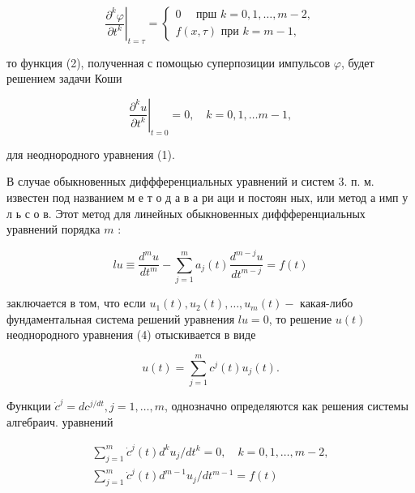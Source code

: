 \documentclass[10pt]{article}
\begin{document}
\[

\left.\frac{\partial^{k} \varphi}{\partial t^{k}}\right|_{t=\tau}=\left\{\begin{array}{l}

0 \quad \text { прш } k=0,1, \ldots, m-2, \\

f(x, \tau) \text { при } k=m-1,

\end{array}\right.

\]



то функция (2), полученная с помощью суперпозиции импульсов $\varphi$, будет решением задачи Коши



\[

\left.\frac{\partial^{k} u}{\partial t^{k}}\right|_{t=0}=0, \quad k=0,1, \ldots m-1,

\]



для неоднородного уравнения (1).



В случае обыкновенных диффференциальных уравнений и систем 3. п. м. известен под названием м е т о д а в а ри аци и постоян ных, или метод а имп у л ь с о в. Этот метод для линейных обыкновенных диффференциальных уравнений порядка $m$ :



\[

l u \equiv \frac{d^{m} u}{d t^{m}}-\sum_{j=1}^{m} a_{j}(t) \frac{d^{m-j} u}{d t^{m-j}}=f(t)

\]



заключается в том, что если $u_{1}(t), u_{2}(t), \ldots, u_{m}(t)-$ какая-либо фундаментальная система решений уравнения $l u=0$, то решение $u(t)$ неоднородного уравнения (4) отыскивается в виде



\[

u(t)=\sum_{j=1}^{m} c^{j}(t) u_{j}(t) .

\]



Функции $\dot{c}^{j}=d c^{j / d t}, j=1, \ldots, m$, однозначно определяются как решения системы алгебраич. уравнений



\[

\begin{gathered}

\sum_{j=1}^{m} \dot{c}^{j}(t) d^{k} u_{j} / d t^{k}=0, \quad k=0,1, \ldots, m-2, \\

\sum_{j=1}^{m} \dot{c}^{j}(t) d^{m-1} u_{j} / d t^{m-1}=f(t)

\end{gathered}

\]
\end{document}
